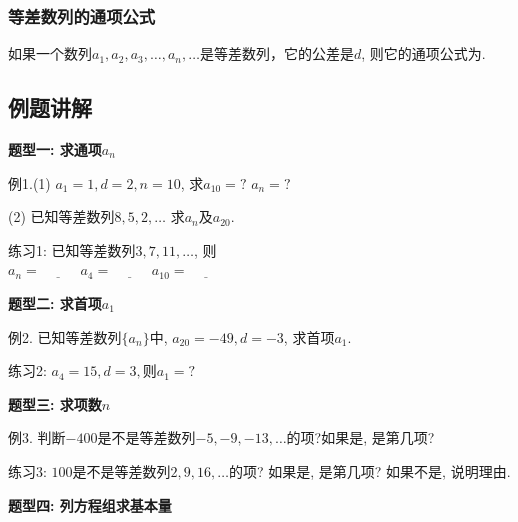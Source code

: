 \documentclass[10pt,a4paper]{article}
\begin{document}
			\subsubsection{等差数列的通项公式} 

				如果一个数列$a_1, a_2, a_3, \ldots, a_n, \ldots $是等差数列，它的公差是$d$, 则它的通项公式为\underline{\hspace{70pt}}. 



		\subsection{例题讲解} %
		\label{sub:例题讲解}

			\textbf{题型一: 求通项$a_n$}

				例1.(1) $a_1=1, d=2, n=10$, 求$a_{10}=?$ $a_n=?$ 
				\vspace{30pt}

				(2) 已知等差数列$8, 5, 2, \ldots$ 求$a_n$及$a_{20}$. 
				\vspace{40pt}
					
				练习1: 已知等差数列$3, 7, 11, \ldots$, 则\\ 
				$a_n=\underline{\hspace{30pt}}$ \hspace{30pt} 
				$a_4=\underline{\hspace{30pt}}$ \hspace{30pt} 
				$a_{10}=\underline{\hspace{30pt}}$
	
	

			\textbf{题型二: 求首项$a_1$}

				例2. 已知等差数列$\{a_n\}$中, $a_{20}=-49, d=-3$, 求首项$a_1$.
				\vspace{40pt}
					

				练习2: $a_4=15, d=3, 则a_1=?$
				\vspace{20pt}
	
	

			\textbf{题型三: 求项数$n$}

				例3. 判断$-400$是不是等差数列$-5, -9, -13, \ldots$的项?如果是, 是第几项? 
				\vspace{40pt}

				练习3: $100$是不是等差数列$2, 9, 16, \ldots$的项? 如果是, 是第几项? 如果不是, 说明理由. 
				\vspace{20pt}
	
	

			\textbf{题型四: 列方程组求基本量}
\end{document}
